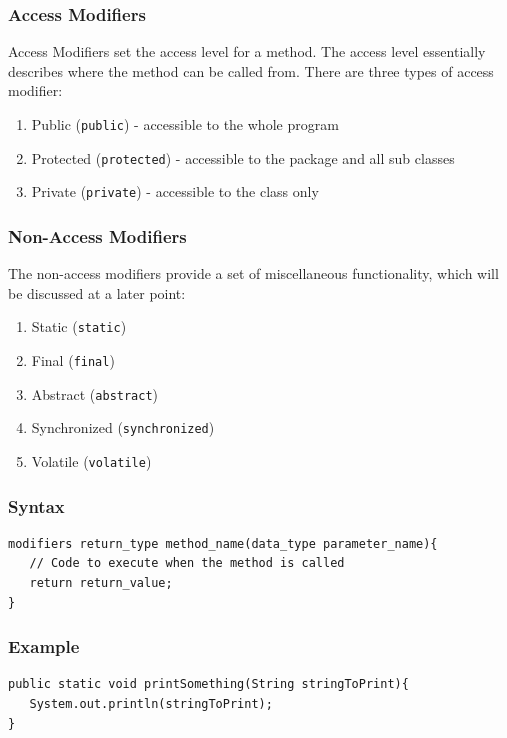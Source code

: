 \documentclass[a4paper]{article}
\begin{document}
\subsubsection*{Access Modifiers}

Access Modifiers set the access level for a method. The access level essentially describes where the method can be called from. There are three types of access modifier:

\begin{enumerate}

\item Public (\texttt{{\color{blue}public}}) - accessible to the whole program
\item Protected (\texttt{{\color{blue}protected}}) - accessible to the package and all sub classes
\item Private (\texttt{{\color{blue}private}}) - accessible to the class only 

\end{enumerate}

\subsubsection*{Non-Access Modifiers}
The non-access modifiers provide a set of miscellaneous functionality, which will be discussed at a later point:

\begin{enumerate}
\item Static (\texttt{{\color{blue}static}})
\item Final (\texttt{{\color{blue}final}})
\item Abstract (\texttt{{\color{blue}abstract}})
\item Synchronized (\texttt{{\color{blue}synchronized}})
\item Volatile (\texttt{{\color{blue}volatile}})
\end{enumerate}


\subsubsection*{Syntax}
\begin{lstlisting}
modifiers return_type method_name(data_type parameter_name){
   // Code to execute when the method is called
   return return_value;
}
\end{lstlisting}

\subsubsection*{Example}
\begin{lstlisting}
public static void printSomething(String stringToPrint){
   System.out.println(stringToPrint);
}
\end{lstlisting}
\end{document}
